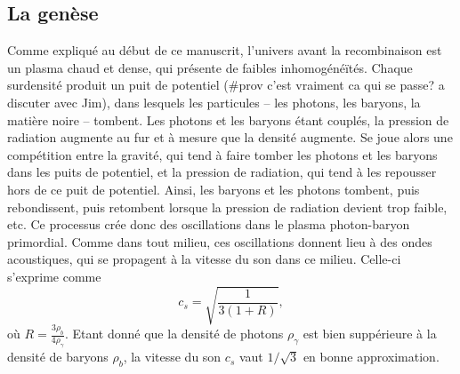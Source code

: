 \documentclass[11pt, twoside, a4paper, openright]{report}
\begin{document}
\subsection{La genèse}
Comme expliqué au début de ce manuscrit, l'univers avant la recombinaison est un plasma chaud et dense,
qui présente de faibles inhomogénéïtés.
Chaque surdensité produit un puit de potentiel (\#prov c'est vraiment ca qui se passe? a discuter avec Jim),
dans lesquels les particules – les photons, les baryons, la matière noire – tombent.
Les photons et les baryons étant couplés, la pression de radiation augmente au fur et à mesure que la densité augmente. Se joue alors une compétition entre la gravité, qui tend à faire tomber les photons et les baryons dans les puits de potentiel, et la pression de radiation, qui tend à les repousser hors de ce puit de potentiel. Ainsi, les baryons et les photons tombent, puis rebondissent, puis retombent lorsque la pression de radiation devient trop faible, etc.
Ce processus crée donc des oscillations dans le plasma photon-baryon primordial. Comme dans tout milieu, ces oscillations donnent lieu à des ondes acoustiques, qui se propagent à la vitesse du son dans ce milieu. Celle-ci s'exprime comme
\begin{equation}
  \label{eq:sound_speed}
  c_{s} = \sqrt{\frac{1}{3(1 + R)}},
\end{equation}
où $R = \frac{3\rho_b}{4\rho_{\gamma}}$. Etant donné que la densité de photons $\rho_{\gamma}$ est bien suppérieure à la densité de baryons $\rho_{b}$, la vitesse du son $c_s$ vaut $1/\sqrt{3}$ en bonne approximation.
\end{document}
